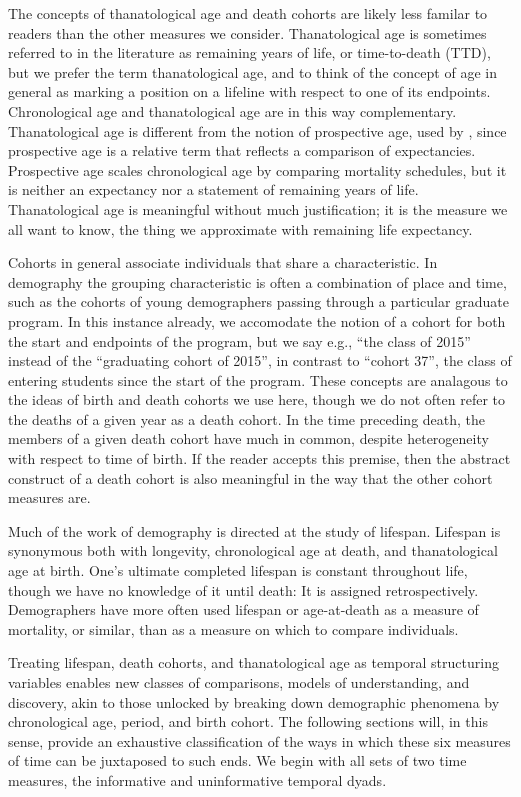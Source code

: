\documentclass[11pt,oneside,a4paper]{article} %
\begin{document}
The concepts of thanatological age and death cohorts are likely less familar to
readers than the other measures we consider. Thanatological age is sometimes
referred to in the literature as remaining years of life, or time-to-death
(TTD), but we prefer the term thanatological age, and to think of the concept of
age in general as marking a position on a lifeline with respect to one of its
endpoints.
Chronological age and thanatological age are in this way complementary. Thanatological age is
different from the notion of prospective age, used by
\citet{sanderson2007new}, since prospective age is a relative term that reflects
a comparison of expectancies. Prospective age scales chronological age by
comparing mortality schedules, but it is neither an expectancy nor a statement
of remaining years of life. Thanatological age is meaningful without much
justification; it is the measure we all want to know, the thing we approximate
with remaining life expectancy.

Cohorts in general associate individuals that share a characteristic. In
demography the grouping characteristic is often a combination of place and time, such as
the cohorts of young demographers passing through a particular graduate program.
In this instance already, we accomodate the notion of a cohort for both the
start and endpoints of the program, but we say e.g., ``the class of 2015''
instead of the ``graduating cohort of 2015'', in contrast to ``cohort 37'', the
 class of entering students since the start of the program.
These concepts are analagous to the ideas of birth and death cohorts we use here, though we do not often refer to the
deaths of a given year as a death cohort. In the time preceding
death, the members of a given death cohort have much in common, despite
heterogeneity with respect to time of birth. If the reader accepts this premise,
then the abstract construct of a death cohort is also meaningful in
the way that the other cohort measures are.

Much of the work of demography is directed at the study of lifespan. Lifespan is
synonymous both with longevity, chronological age at death, and thanatological
age at birth. One's ultimate completed lifespan is constant throughout life,
though we have no knowledge of it until death: It is assigned retrospectively.
Demographers have more often used lifespan or age-at-death as a measure of mortality, or similar, than as a measure on which to compare individuals. 

Treating lifespan,
death cohorts, and thanatological age as temporal structuring variables
enables new classes of comparisons, models of understanding, and discovery,
akin to those unlocked by breaking down demographic phenomena by chronological age,
period, and birth cohort. The following sections will, in this sense, provide an
exhaustive classification of the ways in which these six measures of time can be juxtaposed to such ends.
We begin with all sets of two time measures, the informative and uninformative
temporal dyads.
\end{document}
